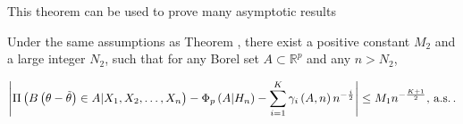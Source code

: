 \begin{comment}
add main theorem
\end{comment}
This theorem can be used to prove many asymptotic results
\begin{thm}
Under the same assumptions as Theorem , there exist
a positive constant $M_{2}$ and a large integer $N_{2}$, such that
for any Borel set $A\subset\mathbb{R}^{p}$ and any $n>N_{2}$,%
\begin{comment}
add subscript to constant
\end{comment}
{} 
\begin{equation}
\left|\Pi\left(B\left(\theta-\tilde{\theta}\right)\in A|X_{1},X_{2},\ldots,X_{n}\right)-\Phi_{p}\left(A|H_{n}\right)-\sum_{i=1}^{K}\gamma_{i}\left(A,n\right)n^{-\frac{i}{2}}\right|\le M_{1}n^{-\frac{K+1}{2}},\,\mathrm{a.s.}\,.\label{eq:asym-exp-poster-prob}
\end{equation}


\end{thm}

